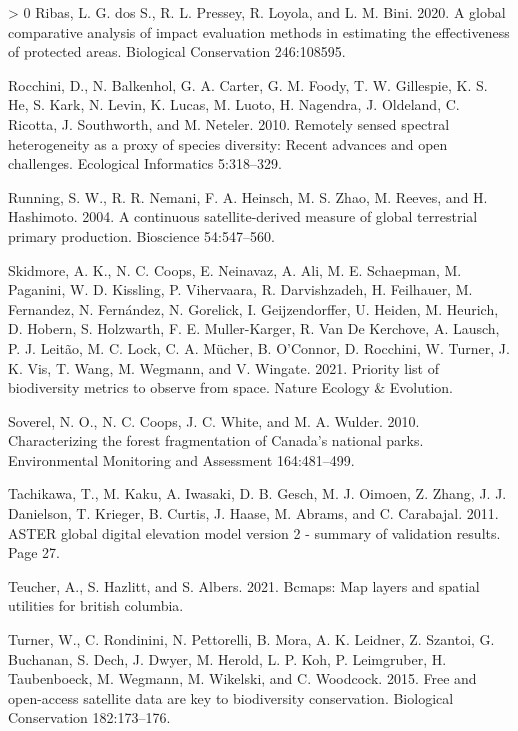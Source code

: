 \documentclass[10pt,oneside]{article}
\newlength{\cslhangindent}
\newenvironment{CSLReferences}[3] %
 {%
  \setlength{\parindent}{0pt}
  \ifodd #1 \everypar{\setlength{\hangindent}{\cslhangindent}}\ignorespaces\fi
  \ifnum #2 > 0
  \setlength{\parskip}{#2\baselineskip}
  \fi
 }%
 {}
\begin{document}
\begin{CSLReferences}{1}{0}
\leavevmode\hypertarget{ref-ribasGlobalComparativeAnalysis2020}{}%
Ribas, L. G. dos S., R. L. Pressey, R. Loyola, and L. M. Bini. 2020. A
global comparative analysis of impact evaluation methods in estimating
the effectiveness of protected areas. Biological Conservation
246:108595.

\leavevmode\hypertarget{ref-rocchini2010}{}%
Rocchini, D., N. Balkenhol, G. A. Carter, G. M. Foody, T. W. Gillespie,
K. S. He, S. Kark, N. Levin, K. Lucas, M. Luoto, H. Nagendra, J.
Oldeland, C. Ricotta, J. Southworth, and M. Neteler. 2010. Remotely
sensed spectral heterogeneity as a proxy of species diversity: Recent
advances and open challenges. Ecological Informatics 5:318--329.

\leavevmode\hypertarget{ref-running2004}{}%
Running, S. W., R. R. Nemani, F. A. Heinsch, M. S. Zhao, M. Reeves, and
H. Hashimoto. 2004. A continuous satellite-derived measure of global
terrestrial primary production. Bioscience 54:547--560.

\leavevmode\hypertarget{ref-skidmore2021}{}%
Skidmore, A. K., N. C. Coops, E. Neinavaz, A. Ali, M. E. Schaepman, M.
Paganini, W. D. Kissling, P. Vihervaara, R. Darvishzadeh, H. Feilhauer,
M. Fernandez, N. Fernández, N. Gorelick, I. Geijzendorffer, U. Heiden,
M. Heurich, D. Hobern, S. Holzwarth, F. E. Muller-Karger, R. Van De
Kerchove, A. Lausch, P. J. Leitão, M. C. Lock, C. A. Mücher, B.
O'Connor, D. Rocchini, W. Turner, J. K. Vis, T. Wang, M. Wegmann, and V.
Wingate. 2021. Priority list of biodiversity metrics to observe from
space. Nature Ecology \& Evolution.

\leavevmode\hypertarget{ref-soverelCharacterizingForestFragmentation2010}{}%
Soverel, N. O., N. C. Coops, J. C. White, and M. A. Wulder. 2010.
Characterizing the forest fragmentation of Canada's national parks.
Environmental Monitoring and Assessment 164:481--499.

\leavevmode\hypertarget{ref-tachikawa2011}{}%
Tachikawa, T., M. Kaku, A. Iwasaki, D. B. Gesch, M. J. Oimoen, Z. Zhang,
J. J. Danielson, T. Krieger, B. Curtis, J. Haase, M. Abrams, and C.
Carabajal. 2011. ASTER global digital elevation model version 2 -
summary of validation results. Page 27.

\leavevmode\hypertarget{ref-R-bcmaps}{}%
Teucher, A., S. Hazlitt, and S. Albers. 2021. Bcmaps: Map layers and
spatial utilities for british columbia.

\leavevmode\hypertarget{ref-turner2015}{}%
Turner, W., C. Rondinini, N. Pettorelli, B. Mora, A. K. Leidner, Z.
Szantoi, G. Buchanan, S. Dech, J. Dwyer, M. Herold, L. P. Koh, P.
Leimgruber, H. Taubenboeck, M. Wegmann, M. Wikelski, and C. Woodcock.
2015. Free and open-access satellite data are key to biodiversity
conservation. Biological Conservation 182:173--176.


\end{CSLReferences}
\end{document}
